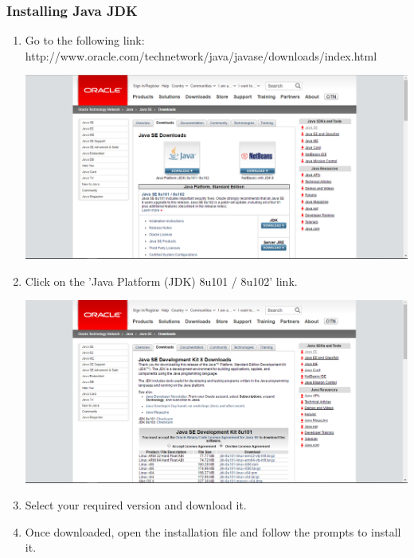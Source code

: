 \documentclass[a4paper,12pt]{article}
\begin{document}
\subsubsection{Installing Java JDK}
\begin{enumerate}
\item  Go to the following link: http://www.oracle.com/technetwork/java/javase/downloads/index.html

\includegraphics[width=0.9\linewidth, center]{./Installation/Java_download_1.PNG}\\[0.4cm]

\item Click on the 'Java Platform (JDK) 8u101 / 8u102' link.

\includegraphics[width=0.9\linewidth, center]{./Installation/Java_download_2.PNG}\\[0.4cm]

\item Select your required version and download it.
\item Once downloaded, open the installation file and follow the prompts to install it.
\end{enumerate}

\newpage
\end{document}
